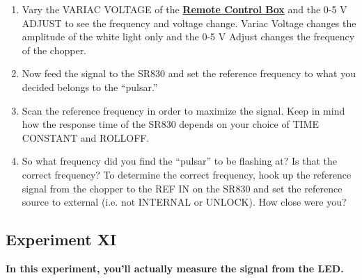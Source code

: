 \documentclass{../lab}
\begin{document}
\begin{enumerate}
    \item Vary the VARIAC VOLTAGE of the \href{http://experimentationlab.berkeley.edu/node/98}{\textbf{Remote Control Box}} and the 0-5 V ADJUST to see the frequency and voltage change. Variac Voltage changes the amplitude of the white light only and the 0-5 V Adjust changes the frequency of the chopper.

    \item Now feed the signal to the SR830 and set the reference frequency to what you decided belongs to the ``pulsar.''

    \item Scan the reference frequency in order to maximize the signal. Keep in mind how the response time of the SR830 depends on your choice of TIME CONSTANT and ROLLOFF.

    \item So what frequency did you find the ``pulsar'' to be flashing at? Is that the correct frequency? To determine the correct frequency, hook up the reference signal from the chopper to the REF IN on the SR830 and set the reference source to external (i.e. not INTERNAL or UNLOCK). How close were you?
\end{enumerate}

\subsection{Experiment XI}

\textbf{In this experiment, you'll actually measure the signal from the LED.}
\end{document}
